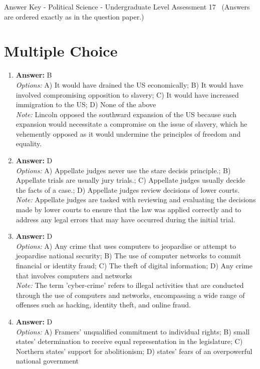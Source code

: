 \documentclass[12pt]{article}
\begin{document}
\begin{center}
Answer Key - Political Science - Undergraduate Level Assessment 17 \
\small (Answers are ordered exactly as in the question paper.)
\end{center}

\section*{Multiple Choice}
\begin{enumerate}[label=\arabic*.]
\item \textbf{Answer:} B
\\ \textit{Options:} A) It would have drained the US economically; B) It would have involved compromising opposition to slavery; C) It would have increased immigration to the US; D) None of the above
\\ \textit{Note:} Lincoln opposed the southward expansion of the US because such expansion would necessitate a compromise on the issue of slavery, which he vehemently opposed as it would undermine the principles of freedom and equality.
\item \textbf{Answer:} D
\\ \textit{Options:} A) Appellate judges never use the stare decisis principle.; B) Appellate trials are usually jury trials.; C) Appellate judges usually decide the facts of a case.; D) Appellate judges review decisions of lower courts.
\\ \textit{Note:} Appellate judges are tasked with reviewing and evaluating the decisions made by lower courts to ensure that the law was applied correctly and to address any legal errors that may have occurred during the initial trial.
\item \textbf{Answer:} D
\\ \textit{Options:} A) Any crime that uses computers to jeopardise or attempt to jeopardise national security; B) The use of computer networks to commit financial or identity fraud; C) The theft of digital information; D) Any crime that involves computers and networks
\\ \textit{Note:} The term 'cyber-crime' refers to illegal activities that are conducted through the use of computers and networks, encompassing a wide range of offenses such as hacking, identity theft, and online fraud.
\item \textbf{Answer:} D
\\ \textit{Options:} A) Framers' unqualified commitment to individual rights; B) small states' determination to receive equal representation in the legislature; C) Northern states' support for abolitionism; D) states' fears of an overpowerful national government

\end{enumerate}
\end{document}
